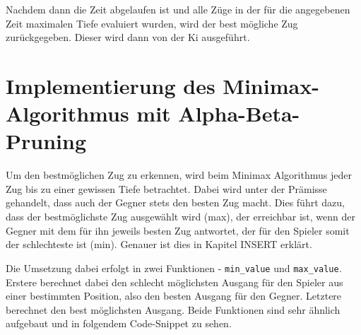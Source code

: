 Nachdem dann die Zeit abgelaufen ist und alle Züge in der für die
angegebenen Zeit maximalen Tiefe evaluiert wurden, wird der best
mögliche Zug zurückgegeben. Dieser wird dann von der Ki ausgeführt.

    \section{Implementierung des Minimax-Algorithmus mit
Alpha-Beta-Pruning}\label{implementierung-des-minimax-algorithmus-mit-alpha-beta-pruning}

Um den bestmöglichen Zug zu erkennen, wird beim Minimax Algorithmus
jeder Zug bis zu einer gewissen Tiefe betrachtet. Dabei wird unter der
Prämisse gehandelt, dass auch der Gegner stets den besten Zug macht.
Dies führt dazu, dass der bestmöglichste Zug ausgewählt wird (max), der
erreichbar ist, wenn der Gegner mit dem für ihn jeweils besten Zug
antwortet, der für den Spieler somit der schlechteste ist (min). Genauer
ist dies in Kapitel INSERT erklärt.

Die Umsetzung dabei erfolgt in zwei Funktionen - \texttt{min\_value} und
\texttt{max\_value}. Erstere berechnet dabei den schlecht möglichsten
Ausgang für den Spieler aus einer bestimmten Position, also den besten
Ausgang für den Gegner. Letztere berechnet den best möglichsten Ausgang.
Beide Funktionen sind sehr ähnlich aufgebaut und in folgendem
Code-Snippet zu sehen.


